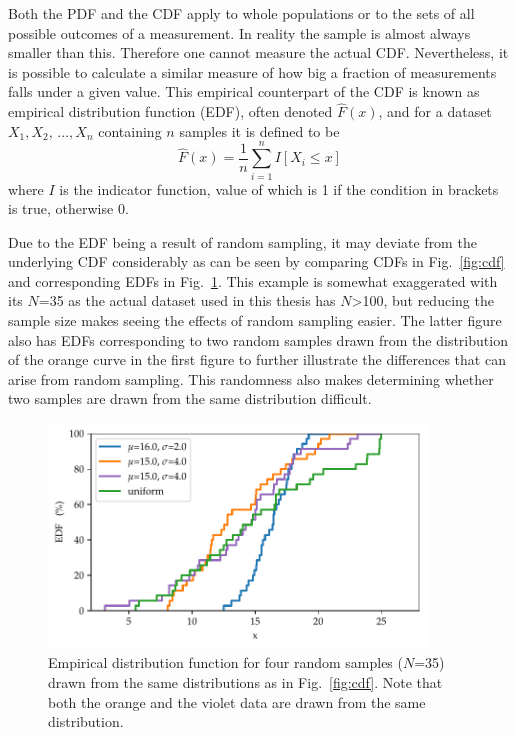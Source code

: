 \documentclass[english, oneside]{HYgradu}
\begin{document}
Both the PDF and the CDF apply to whole populations or to the sets of all possible outcomes of a measurement. In reality the sample is almost always smaller than this. Therefore one cannot measure the actual CDF. Nevertheless, it is possible to calculate a similar measure of how big a fraction of measurements falls under a given value. This empirical counterpart of the CDF is known as empirical distribution function (EDF), often denoted $\hat F(x)$, and for a dataset $X_1, X_2,\,..., X_n$ containing $n$ samples it is defined to be
\begin{equation}
	\hat F(x) = \frac{1}{n}\sum_{i=1}^n I[X_i \leq x]
\end{equation}
where $I$ is the indicator function, value of which is 1 if the condition in brackets is true, otherwise 0. \citep{feigelson2012modern}

Due to the EDF being a result of random sampling, it may deviate from the underlying CDF considerably as can be seen by comparing CDFs in Fig.\ \ref{fig:cdf} and corresponding EDFs in Fig.\ \ref{fig:edf}. This example is somewhat exaggerated with its $N$=35 as the actual dataset used in this thesis has $N$>100, but reducing the sample size makes seeing the effects of random sampling easier. The latter figure also has EDFs corresponding to two random samples drawn from the distribution of the orange curve in the first figure to further illustrate the differences that can arise from random sampling. This randomness also makes determining whether two samples are drawn from the same distribution difficult.

\begin{figure}
   \centering
   \includegraphics[width=0.9\textwidth]{kuvat/edf.pdf}
   \caption{Empirical distribution function for four random samples ($N$=35) drawn from the same distributions as in Fig.\ \ref{fig:cdf}. Note that both the orange and the violet data are drawn from the same distribution.}
   \label{fig:edf}
\end{figure}
\end{document}
